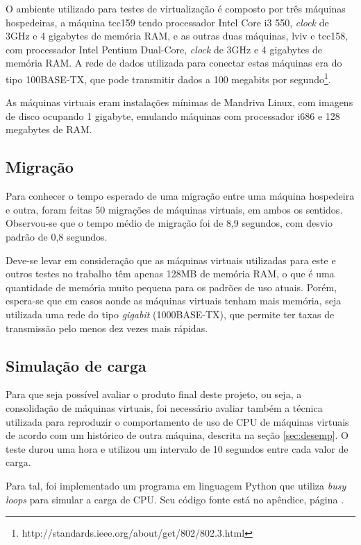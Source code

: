 O ambiente utilizado para testes de virtualização é composto por três máquinas
hospedeiras, a máquina tcc159 tendo processador Intel Core i3 550, \emph{clock}
de 3GHz e 4 gigabytes de memória RAM, e as outras duas máquinas, lviv e tcc158,
com processador Intel Pentium Dual-Core, \emph{clock} de 3GHz e 4 gigabytes de
memória RAM. A rede de dados utilizada para conectar estas máquinas era do tipo
100BASE-TX, que pode transmitir dados a 100 megabits por
segundo\footnote{http://standards.ieee.org/about/get/802/802.3.html}.


As máquinas virtuais eram instalações mínimas de Mandriva Linux, com imagens de
disco ocupando 1 gigabyte, emulando máquinas com processador i686 e 128
megabytes de RAM.

\subsection{Migração}

Para conhecer o tempo esperado de uma migração entre uma máquina hospedeira e
outra, foram feitas 50 migrações de máquinas virtuais, em ambos os sentidos.
Observou-se que o tempo médio de migração foi de 8,9 segundos, com desvio padrão
de 0,8 segundos.

Deve-se levar em consideração que as máquinas virtuais utilizadas para este e
outros testes no trabalho têm apenas 128MB de memória RAM, o que é uma
quantidade de memória muito pequena para os padrões de uso atuais. Porém,
espera-se que em casos aonde as máquinas virtuais tenham mais memória, seja
utilizada uma rede do tipo \emph{gigabit} (1000BASE-TX), que permite ter taxas
de transmissão pelo menos dez vezes mais rápidas.

\subsection{Simulação de carga}\label{sec:loadsim}

Para que seja possível avaliar o produto final deste projeto, ou seja, a
consolidação de máquinas virtuais, foi necessário avaliar também a técnica
utilizada para reproduzir o comportamento de uso de CPU de máquinas virtuais de
acordo com um histórico de outra máquina, descrita na seção \ref{sec:desemp}. O
teste durou uma hora e utilizou um intervalo de 10 segundos entre cada valor de
carga.

Para tal, foi implementado um programa em linguagem Python que utiliza \emph{busy
loops} para simular a carga de CPU. Seu código fonte está no apêndice, página
\pageref{fig:progsimload}.

